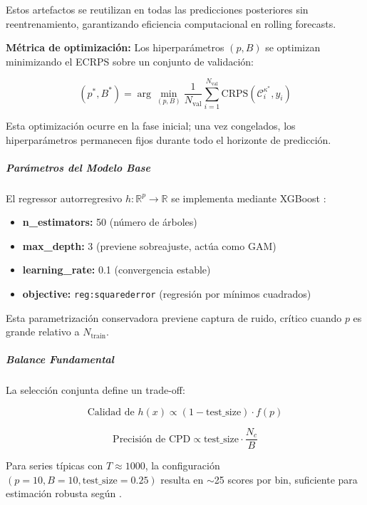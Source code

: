 Estos artefactos se reutilizan en todas las predicciones posteriores sin reentrenamiento, garantizando eficiencia computacional en rolling forecasts.

\textbf{Métrica de optimización:} Los hiperparámetros $(p, B)$ se optimizan minimizando el ECRPS sobre un conjunto de validación:

\begin{equation}
(p^*, B^*) = \arg\min_{(p,B)} \frac{1}{N_{\text{val}}} \sum_{i=1}^{N_{\text{val}}} \text{CRPS}(\mathcal{C}_i^{\kappa^*}, y_i)
\end{equation}

Esta optimización ocurre en la fase inicial; una vez congelados, los hiperparámetros permanecen fijos durante todo el horizonte de predicción.

\subparagraph{Parámetros del Modelo Base}

El regressor autorregresivo $h: \mathbb{R}^p \rightarrow \mathbb{R}$ se implementa mediante XGBoost \parencite{Chen2016}:

\begin{itemize}
    \item \textbf{n\_estimators:} 50 (número de árboles)
    \item \textbf{max\_depth:} 3 (previene sobreajuste, actúa como GAM)
    \item \textbf{learning\_rate:} 0.1 (convergencia estable)
    \item \textbf{objective:} \texttt{reg:squarederror} (regresión por mínimos cuadrados)
\end{itemize}

Esta parametrización conservadora previene captura de ruido, crítico cuando $p$ es grande relativo a $N_{\text{train}}$.

\subparagraph{Balance Fundamental}

La selección conjunta define un trade-off:

\begin{equation}
\text{Calidad de } h(x) \propto (1 - \text{test\_size}) \cdot f(p)
\end{equation}

\begin{equation}
\text{Precisión de CPD} \propto \text{test\_size} \cdot \frac{N_c}{B}
\end{equation}

Para series típicas con $T \approx 1000$, la configuración $(p=10, B=10, \text{test\_size}=0.25)$ resulta en $\sim$25 scores por bin, suficiente para estimación robusta según \textcite{Hyndman1996}.


